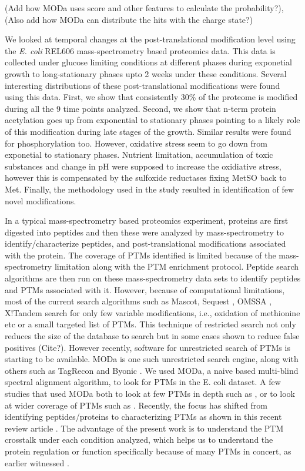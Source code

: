 \documentclass[12pt]{article}
\begin{document}
(Add how MODa uses score and other features to calculate the probability?), (Also add how MODa can distribute the hits with the charge state?)

We looked at temporal changes at the post-translational modification level using the \emph{E. coli} REL606 mass-spectrometry based proteomics data. This data is collected under glucose limiting conditions at different phases during exponetial growth to long-stationary phases upto 2 weeks under these conditions. Several interesting distributions of these post-translational modifications were found using this data. First, we show that consistently 30\% of the proteome is modified during all the 9 time points analyzed. Second, we show that n-term protein acetylation goes up from exponential to stationary phases pointing to a likely role of this modification during late stages of the growth. Similar results were found for phosphorylation too. However, oxidative stress seem to go down from exponetial to stationary phases. Nutrient limitation, accumulation of toxic substances and change in pH were supposed to increase the oxidiative stress, however this is compensated by the sulfoxide reductases fixing MetSO back to Met. Finally, the methodology used in the study resulted in identification of few novel modifications.

In a typical mass-spectrometry based proteomics experiment, proteins are first digested into peptides and then these were analyzed by mass-spectrometry to identify/characterize peptides, and post-translational modifications associated with the protein. The coverage of PTMs identified is limited because of the mass-spectrometry limitation along with the PTM enrichment protocol. Peptide search algorithms are then run on these mass-spectrometry data sets to identify peptides and PTMs associated with it. However, because of computational limitations, most of the current search algorithms such as Mascot\cite{Perkinsetal1999}, Sequest \cite{Engetal1994}, OMSSA \cite{Geeretal2004}, X!Tandem \cite{CraigBeavis2004} search for only few variable modifications, i.e., oxidation of methionine etc or a small targeted list of PTMs. This technique of restricted search not only reduces the size of the database to search but in some cases shown to reduce false positives (Cite?). However recently, software for unrestricted search of PTMs is starting to be available. MODa \cite{Naetal2012} is one such unrestricted search engine, along with others such as TagRecon\cite{Dasarietal2010} and Byonic \cite{Bernetal2012}. We used MODa, a naive based multi-blind spectral alignment algorithm, to look for PTMs in the E. coli dataset. A few studies that used MODa both to look at few PTMs in depth such as \cite{Kimetal2014}, or to look at wider coverage of PTMs such as \cite{Liuetal2013}. Recently, the focus has shifted from identifying peptides/proteins to characterizing PTMs as shown in this recent review article \cite{OlsenMann2013}. The advantage of the present work is to understand the PTM crosstalk under each condition analyzed, which helps us to understand the protein regulation or function specifically because of many PTMs in concert, as earlier witnessed \cite{Pengetal2014}.
\end{document}
